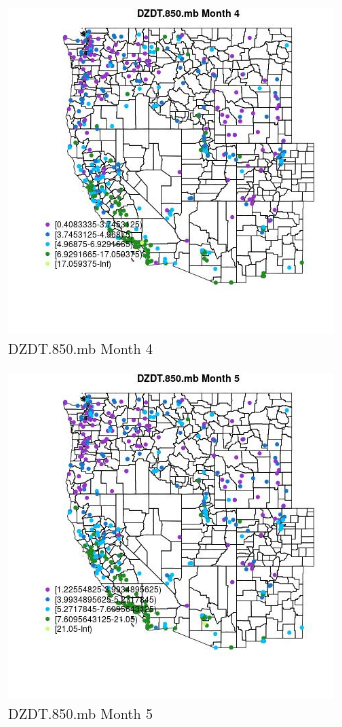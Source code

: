 \begin{figure} 
\centering  
\includegraphics[width=0.77\textwidth]{Code_Outputs/ML_input_report_ML_input_PM25_Step5_part_d_de_duplicated_aves_ML_input_MapObsMo4DZDT850mb.jpg} 
\caption{\label{fig:ML_input_report_ML_input_PM25_Step5_part_d_de_duplicated_aves_ML_inputMapObsMo4DZDT850mb}DZDT.850.mb Month 4} 
\end{figure} 
 

\begin{figure} 
\centering  
\includegraphics[width=0.77\textwidth]{Code_Outputs/ML_input_report_ML_input_PM25_Step5_part_d_de_duplicated_aves_ML_input_MapObsMo5DZDT850mb.jpg} 
\caption{\label{fig:ML_input_report_ML_input_PM25_Step5_part_d_de_duplicated_aves_ML_inputMapObsMo5DZDT850mb}DZDT.850.mb Month 5} 
\end{figure} 
 

